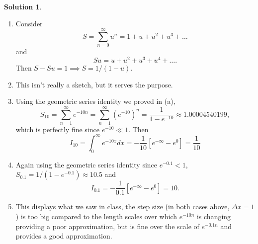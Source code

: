 \documentclass[10pt]{article}
\theoremstyle{definition}
\newtheorem{soln}{Solution}
\begin{document}
\begin{soln}~
  \begin{enumerate}[label=(\alph*)]
    \item Consider $$S=\sum_{n=0}^{\infty}u^n=1+u+u^2+u^3+\dots$$
          and $$Su=u+u^2+u^3+u^4+\dots.$$
          Then $S-Su=1\implies S=1/(1-u)$.
    \item This isn't really a sketch, but it serves the purpose.
          \begin{center}
          \end{center}
    \item Using the geometric series identity we proved in (a),
          $$S_{10}=\sum_{n=1}^{\infty}e^{-10n}=\sum_{n=1}^{\infty}(e^{-10})^n=\frac{1}{1-e^{-10}}\approx 1.00004540199,$$
          which is perfectly fine since $e^{-10}\ll 1$.
          Then
          $$I_{10}=\int_0^\infty e^{-10x}dx=-\frac{1}{10}\left[e^{-\infty}-e^{0}\right]=\frac{1}{10}$$
    \item Again using the geometric series identity since $e^{-0.1}< 1$, $S_{0.1}=1/(1-e^{-0.1})\approx 10.5$ and
          $$I_{0.1}=-\frac{1}{0.1}\left[e^{-\infty}-e^{0}\right]=10.$$
    \item This displays what we saw in class, the step size (in both cases above, $\Delta x=1$) is too big compared to the length scales over which
          $e^{-10n}$ is changing providing a poor approximation, but is fine over the scale of $e^{-0.1n}$ and provides a good approximation.
  \end{enumerate}
\end{soln}
\end{document}
